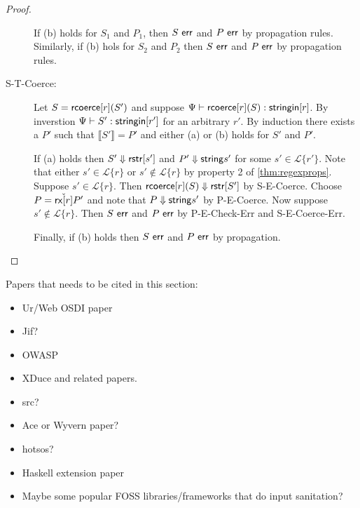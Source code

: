 \documentclass{acm_proc_article-sp}
\theoremstyle{definition}
\newcommand{\Lagr}{\mathcal{L}}
\newcommand{\lang}[1]{\Lagr\{#1\}}
\newcommand{\rcoerce}[2]{{\sf rcoerce}[#1](#2)}
\newcommand{\stringin}[1]{{\sf stringin}[#1]}
\newcommand{\rx}[1]{ {\sf rx}[#1] }
\newcommand{\str}{{\sf string}}
\newcommand{\err}{\ {\sf err}}
\newcommand{\trden}[1]{\llbracket #1 \rrbracket} %
\newcommand{\treduces}{ \Downarrow }
\newcommand{\sreduces}{ \Downarrow }
\begin{document}
\begin{proof}
\begin{description}
If (b) holds for $S_1$ and $P_1$, then $S \err$ and $P \err$ by propagation rules.
Similarly, if (b) hols for $S_2$ and $P_2$ then $S \err$ and $P \err$ by propagation rules.

\item[S-T-Coerce:]
Let $S = \rcoerce{r}{S'}$ and suppose $\sctx \vdash \rcoerce{r}{S} : \stringin{r}$.
By inverstion $\Psi \vdash S' : \stringin{r'}$ for an arbitrary $r'$.
By induction there exists a $P'$ such that $\trden{S'} = P'$ and either (a) or (b)
holds for $S'$ and $P'$.

If (a) holds then $S' \sreduces \rstr{s'}$ and $P' \treduces \str{s'}$ for some $s' \in \lang{r'}$.
Note that either $s' \in \lang{r}$ or $s' \not \in \lang{r}$ by property 2 of \ref{thm:regexprops}.
Suppose $s' \in \lang{r}$. Then $\rcoerce{r}{S} \sreduces \rstr{S'}$ by S-E-Coerce.
Choose $P = \check{\rx{r}}{P'}$ and note that $P \treduces \str{s'}$ by P-E-Coerce.
Now suppose $s' \not \in \lang{r}$. Then $S \err$ and $P \err$ by P-E-Check-Err
and S-E-Coerce-Err.

Finally, if (b) holds then $S \err$ and $P \err$ by propagation.

\end{description}
\end{proof}




Papers that needs to be cited in this section:
\begin{itemize}
  \item Ur/Web OSDI paper
  \item Jif?
  \item OWASP
  \item XDuce and related papers. 
  \item src?
  \item Ace or Wyvern paper?
  \item hotsos?
  \item Haskell extension paper
  \item Maybe some popular FOSS libraries/frameworks that do input sanitation?
\end{itemize}


\end{document}
